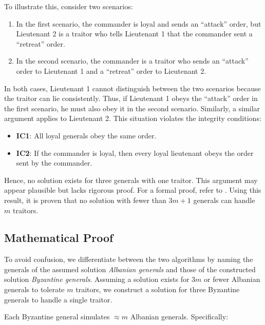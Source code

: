 \documentclass[12pt]{article}
\theoremstyle{remark}
\begin{document}
To illustrate this, consider two scenarios:
\begin{enumerate}
    \item In the first scenario, the commander is loyal and sends an ``attack'' order, but Lieutenant 2 is a traitor who tells Lieutenant 1 that the commander sent a ``retreat'' order.
    \item In the second scenario, the commander is a traitor who sends an ``attack'' order to Lieutenant 1 and a ``retreat'' order to Lieutenant 2.
\end{enumerate}

In both cases, Lieutenant 1 cannot distinguish between the two scenarios because the traitor can lie consistently. Thus, if Lieutenant 1 obeys the ``attack'' order in the first scenario, he must also obey it in the second scenario. Similarly, a similar argument applies to Lieutenant 2. This situation violates the integrity conditions:

\begin{tcolorbox}[colframe=green!80!black, colback=green!10!white, coltitle=black, title=Integrity Conditions]
\begin{itemize}
    \item \textbf{IC1}: All loyal generals obey the same order.
    \item \textbf{IC2}: If the commander is loyal, then every loyal lieutenant obeys the order sent by the commander.
\end{itemize}
\end{tcolorbox}

Hence, no solution exists for three generals with one traitor. This argument may appear plausible but lacks rigorous proof. For a formal proof, refer to \cite{lamport1982byzantine}. Using this result, it is proven that no solution with fewer than $3m + 1$ generals can handle $m$ traitors.
\renewcommand\thesubsection{\arabic{subsection}}
\subsection{Mathematical Proof}

To avoid confusion, we differentiate between the two algorithms by naming the generals of the assumed solution \emph{Albanian generals} and those of the constructed solution \emph{Byzantine generals}. Assuming a solution exists for $3m$ or fewer Albanian generals to tolerate $m$ traitors, we construct a solution for three Byzantine generals to handle a single traitor.

Each Byzantine general simulates $\approx m$ Albanian generals. Specifically:
\end{document}
